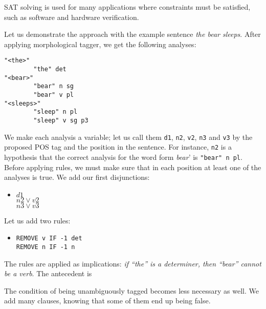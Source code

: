 \documentclass[11pt]{article}
\begin{document}
SAT solving is used for many applications where constraints must be
satisfied, such as software and hardware verification.

Let us demonstrate the approach with the example sentence 
\emph{the bear sleeps}. After applying morphological tagger, we get the following analyses:

\begin{verbatim}
"<the>"
        "the" det
"<bear>"
        "bear" n sg
        "bear" v pl
"<sleeps>"
        "sleep" n pl
        "sleep" v sg p3
\end{verbatim}

We make each analysis a variable; let us call them \texttt{d1}, \texttt{n2}, \texttt{v2}, \texttt{n3} and \texttt{v3} by the proposed POS tag and the position in the sentence.
For instance, \texttt{n2} is a hypothesis that the correct analysis 
for the word form \emph{bear}' is \texttt{"bear" n pl}.
Before applying rules, we must make sure that in each position
at least one of the analyses is true. We add our first disjunctions:

\begin{itemize}
\item [] $d1$ \\ $n2 \vee v2$ \\ $n3 \vee v3$
\end{itemize}

Let us add two rules:
\begin{itemize}
\item [] \texttt{REMOVE v IF -1 det} \\ 
            \texttt{REMOVE n IF -1 n} 

\end{itemize}

The rules are applied as implications: \emph{if ``the'' is a determiner, then ``bear'' cannot be a verb}. 
The antecedent is 
 

The condition of being unambiguously tagged becomes less necessary as well.
We add many clauses, knowing that some of them end up being false.
\end{document}
